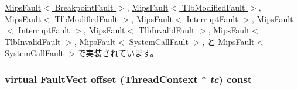\hyperlink{classMipsISA_1_1MipsFault_a9c059b781f653170e9da1d520c6d96b1}{MipsFault$<$ BreakpointFault $>$}, \hyperlink{classMipsISA_1_1MipsFault_a9c059b781f653170e9da1d520c6d96b1}{MipsFault$<$ TlbModifiedFault $>$}, \hyperlink{classMipsISA_1_1MipsFault_a9c059b781f653170e9da1d520c6d96b1}{MipsFault$<$ TlbModifiedFault $>$}, \hyperlink{classMipsISA_1_1MipsFault_a9c059b781f653170e9da1d520c6d96b1}{MipsFault$<$ InterruptFault $>$}, \hyperlink{classMipsISA_1_1MipsFault_a9c059b781f653170e9da1d520c6d96b1}{MipsFault$<$ InterruptFault $>$}, \hyperlink{classMipsISA_1_1MipsFault_a9c059b781f653170e9da1d520c6d96b1}{MipsFault$<$ TlbInvalidFault $>$}, \hyperlink{classMipsISA_1_1MipsFault_a9c059b781f653170e9da1d520c6d96b1}{MipsFault$<$ TlbInvalidFault $>$}, \hyperlink{classMipsISA_1_1MipsFault_a9c059b781f653170e9da1d520c6d96b1}{MipsFault$<$ SystemCallFault $>$}, と \hyperlink{classMipsISA_1_1MipsFault_a9c059b781f653170e9da1d520c6d96b1}{MipsFault$<$ SystemCallFault $>$}で実装されています。\hypertarget{classMipsISA_1_1MipsFaultBase_abc58e13990620c35409a5eaf15679c3c}{
\subsubsection[{offset}]{\setlength{\rightskip}{0pt plus 5cm}virtual {\bf FaultVect} offset ({\bf ThreadContext} $\ast$ {\em tc}) const}}
\label{classMipsISA_1_1MipsFaultBase_abc58e13990620c35409a5eaf15679c3c}


